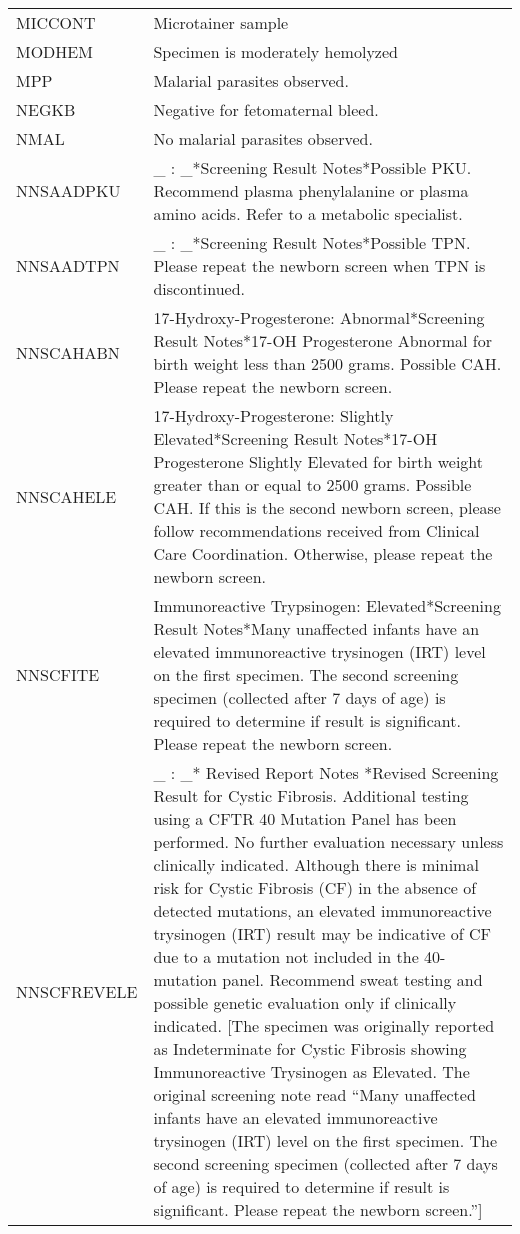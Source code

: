 \begin{fullwidth}
\begin{longtable}{p{.20\linewidth} p{.75\linewidth}}
MICCONT      & Microtainer sample\\
MODHEM       & Specimen is moderately hemolyzed\\
MPP          & Malarial parasites observed.\\
NEGKB        & Negative for fetomaternal bleed.\\
NMAL         & No malarial parasites observed.\\
NNSAADPKU    & \_ : \_*Screening Result Notes*Possible PKU. Recommend plasma phenylalanine or plasma amino acids. Refer to a metabolic specialist.\\
NNSAADTPN    & \_ : \_*Screening Result Notes*Possible TPN. Please repeat the newborn screen when TPN is discontinued.\\
NNSCAHABN    & 17-Hydroxy-Progesterone:  Abnormal*Screening Result Notes*17-OH Progesterone Abnormal for birth weight less than 2500 grams. Possible CAH.  Please repeat the newborn screen.\\
NNSCAHELE    & 17-Hydroxy-Progesterone: Slightly Elevated*Screening Result Notes*17-OH Progesterone Slightly Elevated for birth weight greater than or equal to 2500 grams. Possible CAH. If this is the second newborn screen, please follow recommendations received from Clinical Care Coordination. Otherwise, please repeat the newborn screen.\\
NNSCFITE     & Immunoreactive Trypsinogen: Elevated*Screening Result Notes*Many unaffected infants have an elevated immunoreactive trysinogen (IRT) level on the first specimen. The second screening specimen (collected after 7 days of age) is required to determine if result is significant. Please repeat the newborn screen.\\
NNSCFREVELE  & \_ : \_* Revised Report Notes *Revised Screening Result for Cystic Fibrosis. Additional testing using a CFTR 40 Mutation Panel has been performed. No further evaluation necessary unless clinically indicated. Although there is minimal risk for Cystic Fibrosis (CF) in the absence of detected mutations, an elevated immunoreactive trysinogen (IRT) result may be indicative of CF due to a mutation not included in the 40-mutation panel. Recommend sweat testing and possible genetic evaluation only if clinically indicated. [The specimen was originally reported as Indeterminate for Cystic Fibrosis showing Immunoreactive Trysinogen as Elevated. The original screening note read “Many unaffected infants have an elevated immunoreactive trysinogen (IRT) level on the first specimen. The second screening specimen (collected after 7 days of age) is required to determine if result is significant. Please repeat the newborn screen.”] \\

\end{longtable}
\end{fullwidth}
